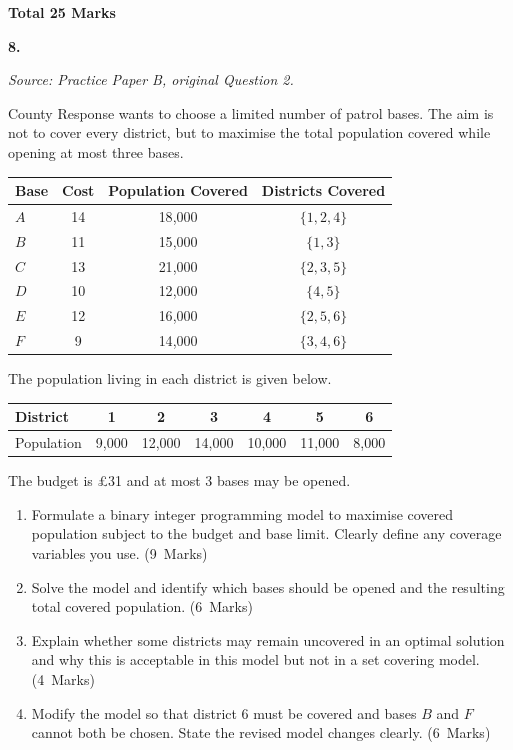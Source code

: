 \documentclass[11pt,a4paper]{article}
\newcommand{\markalloc}[1]{\nobreak\hfill\mbox{(#1 Marks)}}
\newcommand{\questiontotal}[1]{\begin{flushright}\textbf{Total #1 Marks}\end{flushright}}
\begin{document}
\questiontotal{25}

\newpage

\textbf{8.}

\textit{Source: Practice Paper B, original Question 2.}



County Response wants to choose a limited number of patrol bases.
The aim is not to cover every district, but to maximise the total population covered while opening at most three bases.

\begin{center}
\begin{tabular}{lccc}
\toprule
Base & Cost & Population Covered & Districts Covered \\
\midrule
$A$ & 14 & 18{,}000 & $\{1,2,4\}$ \\
$B$ & 11 & 15{,}000 & $\{1,3\}$ \\
$C$ & 13 & 21{,}000 & $\{2,3,5\}$ \\
$D$ & 10 & 12{,}000 & $\{4,5\}$ \\
$E$ & 12 & 16{,}000 & $\{2,5,6\}$ \\
$F$ & 9  & 14{,}000 & $\{3,4,6\}$ \\
\bottomrule
\end{tabular}
\end{center}

The population living in each district is given below.

\begin{center}
\begin{tabular}{lcccccc}
\toprule
District & 1 & 2 & 3 & 4 & 5 & 6 \\
\midrule
Population & 9{,}000 & 12{,}000 & 14{,}000 & 10{,}000 & 11{,}000 & 8{,}000 \\
\bottomrule
\end{tabular}
\end{center}

The budget is \pounds31 and at most 3 bases may be opened.

\begin{enumerate}
\item Formulate a binary integer programming model to maximise covered population subject to the budget and base limit. Clearly define any coverage variables you use. \markalloc{9}

\item Solve the model and identify which bases should be opened and the resulting total covered population. \markalloc{6}

\item Explain whether some districts may remain uncovered in an optimal solution and why this is acceptable in this model but not in a set covering model. \markalloc{4}

\item Modify the model so that district 6 must be covered and bases $B$ and $F$ cannot both be chosen. State the revised model changes clearly. \markalloc{6}
\end{enumerate}
\end{document}
